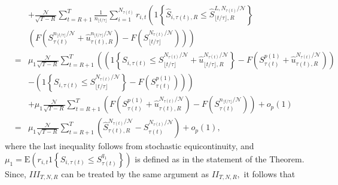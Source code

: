\begin{eqnarray*}
&&+\frac{\mathcal{N}}{\sqrt{T-R}}\sum_{t=R+1}^{T}\frac{1}{n_{\lfloor t/\tau
\rfloor }}\sum_{i=1}^{N_{\tau(t)}}r_{i,t}\left( 1\left\{ 
\widehat{S}_{i,\tau(t),R}\leq \widehat{S}_{\lfloor t/\tau
\rfloor ,R}^{L,N_{\tau(t)}/\mathcal{N}}\right\} \right.  \\
&&\left. \left( F\left( S_{\tau(t)}^{n_{\lfloor t/\tau
\rfloor }/\mathcal{N}}+\widehat{u}_{\tau(t),R}^{n_{\lfloor
t/\tau \rfloor }/\mathcal{N}}\right) -F\left( S_{\lfloor t/\tau \rfloor
}^{N_{\tau(t)}/\mathcal{N}}\right) \right) \right)  \\
&=&\mu _{1}\frac{\mathcal{N}}{\sqrt{T-R}}\sum_{t=R+1}^{T}\left( \left(
1\left\{ S_{i,\tau(t)}\leq S_{\lfloor t/\tau \rfloor
}^{N_{\tau(t)}/\mathcal{N}}+\widehat{u}_{\lfloor t/\tau
\rfloor ,R}^{N_{\tau(t)}/\mathcal{N}}\right\} -F\left(
S_{\tau(t)}^{p(1)}+%
\widehat{u}_{\tau(t),R}^{N_{\tau(t)}/%
\mathcal{N}}\right) \right) \right.  \\
&&\left. -\left( 1\left\{ S_{i,\tau(t)}\leq S_{\lfloor
t/\tau \rfloor }^{N_{\tau(t)}/\mathcal{N}}\right\} -F\left(
S_{\tau(t)}^{p(1)}\right)
\right) \right)  \\
&&+\mu _{1}\frac{\mathcal{N}}{\sqrt{T-R}}\sum_{t=R+1}^{T}\left( F\left(
S_{\tau(t)}^{p(1)}+%
\widehat{u}_{\tau(t),R}^{N_{\tau(t)}/%
\mathcal{N}}\right) -F\left( S_{\tau(t)}^{n_{\lfloor t/\tau
\rfloor }/\mathcal{N}}\right) \right) +o_{p}(1) \\
&=&\mu _{1}\frac{\mathcal{N}}{\sqrt{T-R}}\sum_{t=R+1}^{T}\left( \widehat{S}%
_{\tau(t),R}^{N_{\tau(t)}/\mathcal{N}%
}-S_{\tau(t)}^{N_{\tau(t)}/\mathcal{N}%
}\right) +o_{p}(1),
\end{eqnarray*}%
where the last inequality follows from stochastic equicontinuity, and $\mu
_{1}=\mathrm{E}\left( r_{i,t}1\left\{ S_{i,\tau(t)}\leq
S_{\tau(t)}^{q_{1}}\right\} \right) $ is defined as in the
statement of the Theorem. Since, $III_{T,N,R}$ can be treated by the same
argument as $II_{T,N,R},$ it follows that%
